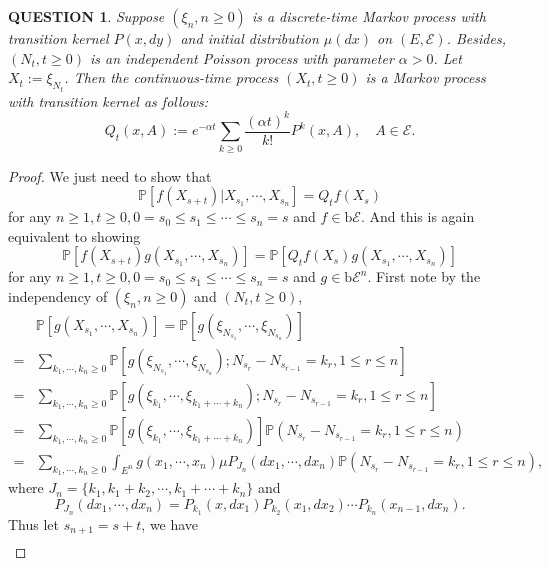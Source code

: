 \documentclass[12pt]{article}
\renewcommand{\(}{\left(}%
\renewcommand{\)}{\right)}%
\renewcommand{\[}{\left[}%
\renewcommand{\]}{\right]}%
\newcommand{\p}{\mathbb{P}}
\newcommand{\e}{\mathscr{E}}
\newtheorem{question}{QUESTION}[section]}
\newtheorem{proof}{Proof.}}
\begin{document}
  \begin{question}
  	Suppose $(\xi_n,n\geq 0)$ is a discrete-time Markov process with transition kernel $P(x,dy)$ and initial distribution $\mu(dx)$ on $(E,\e)$. Besides, $(N_t,t\geq 0)$ is an independent Poisson process with parameter $\alpha>0$. Let $X_t:=\xi_{N_t}$. Then the continuous-time process $(X_t,t\geq 0)$ is a Markov process with transition kernel as follows:
  	\begin{equation*}
  		Q_t(x,A):=e^{-\alpha t}\sum_{k\geq 0}\frac{(\alpha t)^k}{k!}P^k(x,A),\quad A\in\e.
  	\end{equation*}
  \end{question}
  \begin{proof}
  	We just need to show that 
  	\begin{equation*}
  		\p[f(X_{s+t})|X_{s_1},\cdots,X_{s_n}]=Q_tf(X_s) 
  	\end{equation*} 
  	for any $n\geq 1,t\geq0,0=s_0\leq s_1\leq \cdots\leq s_n=s$ and $f\in\mathrm{b}\e$. And this is again equivalent to showing
  	\begin{equation*}
  		\p[f(X_{s+t})g(X_{s_1},\cdots,X_{s_n})]=\p[Q_tf(X_s)g(X_{s_1},\cdots,X_{s_n})]
  	\end{equation*}
  	for any $n\geq 1,t\geq0,0=s_0\leq s_1\leq \cdots\leq s_n=s$ and $g\in\mathrm{b}\e^n$. First note by the independency of $(\xi_n,n\geq 0)$ and $(N_t,t\geq 0)$,
  	\begin{align*}
  		&\p[g(X_{s_1},\cdots,X_{s_n})]=\p[g(\xi_{N_{s_1}},\cdots,\xi_{N_{s_n}} )]\\
  		=&\sum_{k_1,\cdots,k_n\geq 0}\p\[g(\xi_{N_{s_1}},\cdots,\xi_{N_{s_n}} );N_{s_r}-N_{s_{r-1}}=k_r,1\leq r\leq n \]\\
  		=&\sum_{k_1,\cdots,k_n\geq 0}\p\[g(\xi_{k_1},\cdots,\xi_{k_1+\cdots+k_n});N_{s_r}-N_{s_{r-1}}=k_r,1\leq r\leq n \] \\
  		=&\sum_{k_1,\cdots,k_n\geq 0}\p[g(\xi_{k_1},\cdots,\xi_{k_1+\cdots+k_n} )]\p(N_{s_r}-N_{s_{r-1}}=k_r,1\leq r\leq n )\\
  		=&\sum_{k_1,\cdots,k_n\geq 0}\int_{E^n}g(x_1,\cdots,x_n)\mu P_{J_n}(dx_1,\cdots,dx_n)\p(N_{s_r}-N_{s_{r-1}}=k_r,1\leq r\leq n ),
  	\end{align*}
  	where $J_n=\{k_1,k_1+k_2,\cdots,k_1+\cdots+ k_n\}$ and
  	\begin{equation*}
  		P_{J_n}(dx_1,\cdots,dx_n)=P_{k_1}(x,dx_1)P_{k_2}(x_1,dx_2)\cdots P_{k_n}(x_{n-1},dx_n).
  	\end{equation*}
  	Thus let $s_{n+1}=s+t$, we have
  	\begin{align*}

\end{align*}
\end{proof}
\end{document}
